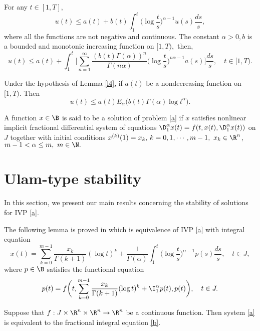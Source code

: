 \begin{lem}\cite{dq}\label{l4}
For any $t\in[1,T],$
\begin{equation*}
u(t)\leq a(t)+b(t)\int_{1}^{t}\bigg(\log{\frac{t}{s}}\bigg)^{\alpha-1}u(s)\frac{ds}{s},
\end{equation*}
where all the functions are not negative and continuous. The constant $\alpha>0,b$ is a bounded and monotonic increasing function on $[1,T),$ then,
\begin{equation*}
u(t)\leq a(t)+\int_{1}^{t}\bigg[\sum_{n=1}^{\infty}\frac{(b(t)\Gamma(\alpha))^{n}}{\Gamma(n\alpha)}\bigg(\log{\frac{t}{s}}\bigg)^{n\alpha-1}a(s)\bigg]\frac{ds}{s},\quad t\in[1,T).
\end{equation*}
\end{lem}
\begin{rem}
Under the hypothesis of Lemma \ref{l4}, if $a(t)$ be a nondecreasing function on $[1,T).$ Then
\begin{equation*}
u(t)\leq a(t)E_{\alpha}\big(b(t)\Gamma(\alpha){\log{t}}^{\alpha}\big).
\end{equation*}
\end{rem}
\begin{defn}
A function $x\in\B$ is said to be a solution of problem \eqref{a} if $x$ satisfies nonlinear implicit fractional differential system of equations $ \D_{1}^{\alpha}x(t)=f(t,x(t),{\D_{1}^{\alpha}x(t)})$ on $J$ together with initial conditions $x^{(k)}(1)=x_k,\, k=0,1,\cdots,m-1,\,\,x_k\in{\R}^{n}$, $m-1<\alpha\leq m,\,\, m\in\N.$
\end{defn}
\section{Ulam-type stability}
In this section, we present our main results concerning the stability of solutions for IVP \eqref{a}.

The following lemma is proved in \cite{dnj} which is equivalence of IVP \eqref{a} with integral equation
\begin{equation}\label{b}
x(t)=\sum_{k=0}^{m-1}\frac{x_k}{\Gamma(k+1)}(\log{t})^k+\frac{1}{\Gamma(\alpha)}\int_{1}^{t}\bigg(\log{\frac{t}{s}}\bigg)^{\alpha-1}p(s)\frac{ds}{s},\quad t\in{J},
\end{equation}
where $p\in\B$ satisfies the functional equation
\begin{equation}\label{c}
p(t)=f\bigg(t,\sum_{k=0}^{m-1}\frac{x_k}{\Gamma(k+1)}(\log{t})^k+\I_{1}^{\alpha}p(t),p(t)\bigg),\quad t\in{J}.
\end{equation}
\begin{lem}\label{lequi}\cite{dnj}
Suppose that $f:J\times{\R}^{n}\times{\R}^{n}\to{\R}^{n}$ be a continuous function. Then system \eqref{a} is equivalent to the fractional integral equation \eqref{b}.
\end{lem}

